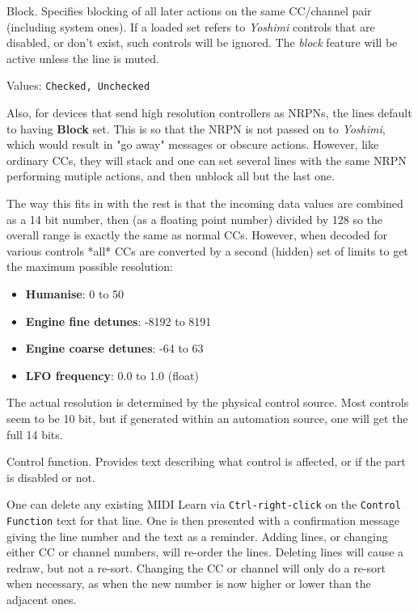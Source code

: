    Block.
   Specifies blocking of all later actions on the same CC/channel pair
   (including system ones).
   If a loaded set refers to \textsl{Yoshimi} controls that are disabled, or
   don't exist, such controls will be ignored.
   The \textsl{block} feature will be active unless the line is muted.

   Values: \texttt{Checked, Unchecked}

   Also, for devices that send high resolution controllers as NRPNs, the lines default to having \textbf{Block} set. This is so that the NRPN is not passed
   on to \textsl{Yoshimi}, which would result in "go away" messages or obscure
   actions. However, like ordinary CCs, they will stack and one can set several
   lines with the same NRPN performing mutiple actions, and then unblock all
   but the last one.

   The way this fits in with the rest is that the incoming data values are
   combined as a 14 bit number, then (as a floating point number) divided by
   128 so the overall range is exactly the same as normal CCs.  However, when
   decoded for various controls *all* CCs are converted by a second (hidden)
   set of limits to get the maximum possible resolution:

   \begin{itemize}
      \item \textbf{Humanise}: 0 to 50
      \item \textbf{Engine fine detunes}: -8192 to 8191
      \item \textbf{Engine coarse detunes}: -64 to 63
      \item \textbf{LFO frequency}: 0.0 to 1.0 (float)
   \end{itemize}

   The actual resolution is determined by the physical control
   source. Most controls seem to be 10 bit, but if generated within an
   automation source, one will get the full 14 bits.

   Control function.
   Provides text describing what control is affected, or if the
   part is disabled or not.

   One can delete any existing MIDI Learn via
   \texttt{Ctrl-right-click}
   on the
   \texttt{Control Function} text for that line.
   One is then presented with a confirmation message giving the line number and
   the text as a reminder.
   Adding lines, or changing either CC or channel numbers, will
   re-order the lines.
   Deleting lines will cause a redraw, but not a re-sort.
   Changing the CC or channel will only do a re-sort when necessary, as when the
   new number is now higher or lower than the adjacent ones.

